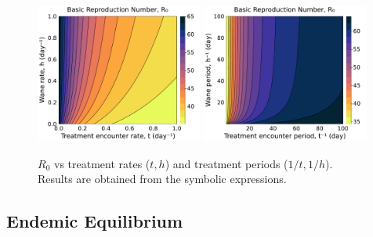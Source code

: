 \documentclass{article}
\begin{document}
\begin{figure}[H]
    \centering
    \includegraphics[width=0.49\textwidth]{../../fig/brn_txh_heatmap_s.pdf}
    \includegraphics[width=0.49\textwidth]{../../fig/brn_txh_heatmap_rev_s.pdf}
    \caption{\(R_0\) vs treatment rates (\(t,h\)) and treatment periods (\(1/t,1/h\)). Results are obtained from the symbolic expressions.}
\end{figure}

\subsection{Endemic Equilibrium}
\end{document}
